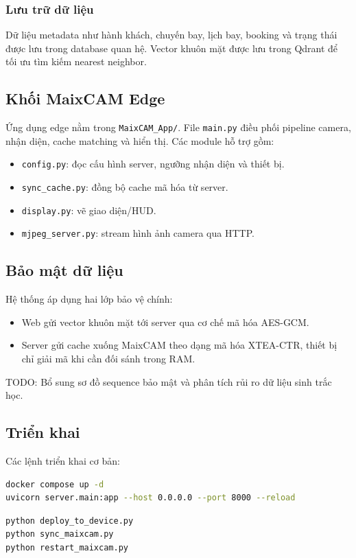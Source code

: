 \subsubsection{Lưu trữ dữ liệu}
Dữ liệu metadata như hành khách, chuyến bay, lịch bay, booking và trạng thái được lưu trong database quan hệ. Vector khuôn mặt được lưu trong Qdrant để tối ưu tìm kiếm nearest neighbor.

\subsection{Khối MaixCAM Edge}
Ứng dụng edge nằm trong \texttt{MaixCAM\_App/}. File \texttt{main.py} điều phối pipeline camera, nhận diện, cache matching và hiển thị. Các module hỗ trợ gồm:

\begin{itemize}
  \item \texttt{config.py}: đọc cấu hình server, ngưỡng nhận diện và thiết bị.
  \item \texttt{sync\_cache.py}: đồng bộ cache mã hóa từ server.
  \item \texttt{display.py}: vẽ giao diện/HUD.
  \item \texttt{mjpeg\_server.py}: stream hình ảnh camera qua HTTP.
\end{itemize}

\subsection{Bảo mật dữ liệu}
Hệ thống áp dụng hai lớp bảo vệ chính:

\begin{itemize}
  \item Web gửi vector khuôn mặt tới server qua cơ chế mã hóa AES-GCM.
  \item Server gửi cache xuống MaixCAM theo dạng mã hóa XTEA-CTR, thiết bị chỉ giải mã khi cần đối sánh trong RAM.
\end{itemize}

TODO: Bổ sung sơ đồ sequence bảo mật và phân tích rủi ro dữ liệu sinh trắc học.

\subsection{Triển khai}
Các lệnh triển khai cơ bản:

\begin{lstlisting}[language=bash,caption={Chạy server và web}]
docker compose up -d
uvicorn server.main:app --host 0.0.0.0 --port 8000 --reload
\end{lstlisting}

\begin{lstlisting}[language=bash,caption={Triển khai ứng dụng lên MaixCAM}]
python deploy_to_device.py
python sync_maixcam.py
python restart_maixcam.py
\end{lstlisting}
